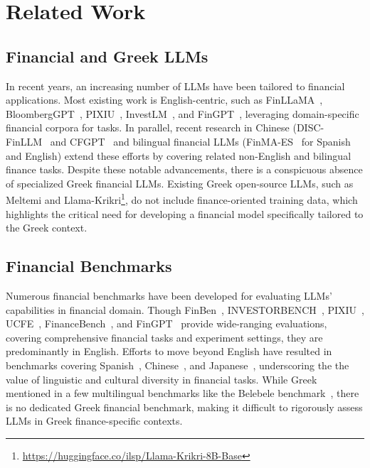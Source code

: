 \section{Related Work}
\subsection{Financial and Greek LLMs}
In recent years, an increasing number of LLMs have been tailored to financial applications. 
Most existing work is English-centric, such as FinLLaMA~\citep{xie2024openfinllmsopenmultimodallarge}, BloombergGPT~\citep{DBLP:journals/corr/abs-2303-17564}, PIXIU~\citep{DBLP:conf/nips/XieHZLPLH23}, InvestLM~\citep{DBLP:journals/corr/abs-2309-13064}, and FinGPT~\citep{DBLP:journals/corr/abs-2306-06031}, leveraging domain-specific financial corpora for tasks. 
In parallel, recent research in Chinese (DISC-FinLLM~\citep{DBLP:journals/corr/abs-2310-15205} and CFGPT~\citep{DBLP:journals/corr/abs-2309-10654} and bilingual financial LLMs (FinMA-ES~\citep{DBLP:conf/kdd/ZhangXYFHLLQA0H24} for Spanish and English) extend these efforts by covering related non-English and bilingual finance tasks. 
Despite these notable advancements, there is a conspicuous absence of specialized Greek financial LLMs. Existing Greek open-source LLMs, such as Meltemi \citep{DBLP:journals/corr/abs-2407-20743} and Llama-Krikri\footnote{\url{https://huggingface.co/ilsp/Llama-Krikri-8B-Base}}, do not include finance-oriented training data, which highlights the critical need for developing a financial model specifically tailored to the Greek context.

\subsection{Financial Benchmarks}
Numerous financial benchmarks have been developed for evaluating LLMs' capabilities in financial domain.
Though FinBen~\citep{xie2024finbenholisticfinancialbenchmark}, INVESTORBENCH~\citep{li2024investorbenchbenchmarkfinancialdecisionmaking}, PIXIU~\citep{DBLP:conf/nips/XieHZLPLH23}, UCFE~\citep{yang2025ucfeusercentricfinancialexpertise}, FinanceBench~\citep{islam2023financebenchnewbenchmarkfinancial}, and FinGPT~\citep{wang2023fingptinstructiontuningbenchmark} provide wide-ranging evaluations, covering comprehensive financial tasks and experiment settings, they are predominantly in English.
Efforts to move beyond English have resulted in benchmarks covering Spanish~\citep{DBLP:conf/kdd/ZhangXYFHLLQA0H24}, Chinese~\citep{nie2024cfinbenchcomprehensivechinesefinancial}, and Japanese~\citep{hirano2024constructionjapanesefinancialbenchmark}, underscoring the the value of linguistic and cultural diversity in financial tasks. 
While Greek mentioned in a few multilingual benchmarks like the Belebele benchmark~\citep{DBLP:conf/acl/BandarkarLMASHG24}, there is no dedicated Greek financial benchmark, making it difficult to rigorously assess LLMs in Greek finance-specific contexts.

